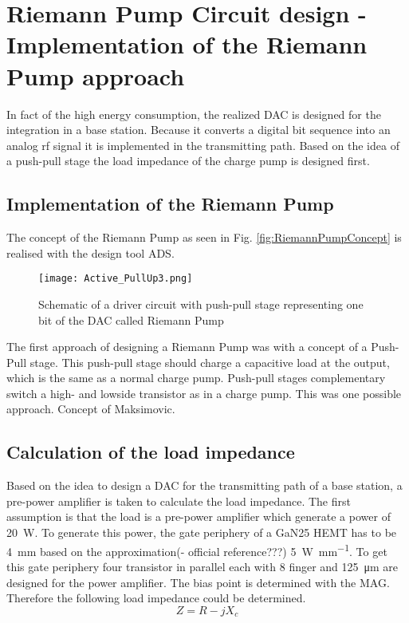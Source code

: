 \chapter{Riemann Pump Circuit design - Implementation of the Riemann Pump approach}
In fact of the high energy consumption, the realized DAC is designed for the integration in a base station. Because it converts a digital bit sequence into an analog rf signal it is implemented in the transmitting path. Based on the idea of a push-pull stage the load impedance of the charge pump is designed first.
\section{Implementation of the Riemann Pump}
The concept of the Riemann Pump as seen in Fig. \ref{fig:RiemannPumpConcept} is realised with the design tool ADS.

\begin{figure}[ht]
	\centering
  \texttt{[image: Active\_PullUp3.png]}
	\caption{Schematic of a driver circuit with push-pull stage representing one bit of the DAC called Riemann Pump}
	\label{RiemannPump}
\end{figure}

The first approach of designing a Riemann Pump was with a concept of a Push-Pull stage. This push-pull stage should charge a capacitive load at the output, which is the same as a normal charge pump. Push-pull stages complementary switch a high- and lowside transistor as in a charge pump. This was one possible approach. Concept of Maksimovic. 
\section{Calculation of the load impedance}
Based on the idea to design  a DAC for the transmitting path of a base station, a pre-power amplifier is taken to calculate the load impedance. The first assumption is that the load is a pre-power amplifier which generate a power of \SI{20}{\watt}. To generate this power, the gate periphery of a GaN25 HEMT has to be \SI{4}{\milli \metre} based on the approximation(- official reference???) \SI[per-mode=fraction]{5}{\watt\per\milli\metre}. To get this gate periphery four transistor in parallel each with 8 finger and \SI{125}{\micro \metre} are designed for the power amplifier. The bias point is determined with the MAG. Therefore the following load impedance could be determined.
\begin{equation}
Z = R - jX_c
\end{equation}


